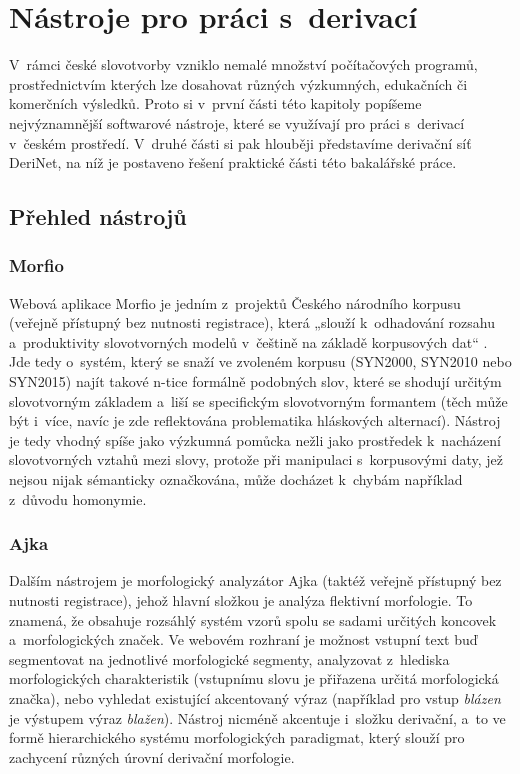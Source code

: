 \hypertarget{nuxe1stroje-pro-pruxe1ci-s-derivacuxed}{%
\chapter{Nástroje pro práci
s~derivací}\label{nuxe1stroje-pro-pruxe1ci-s-derivacuxed}}

V~rámci české slovotvorby vzniklo nemalé množství počítačových programů,
prostřednictvím kterých lze dosahovat různých výzkumných, edukačních či
komerčních výsledků. Proto si v~první části této kapitoly popíšeme
nejvýznamnější softwarové nástroje, které se využívají pro práci
s~derivací v~českém prostředí. V~druhé části si pak hlouběji představíme
derivační síť DeriNet, na níž je postaveno řešení praktické části této
bakalářské práce.

\hypertarget{pux159ehled-nuxe1strojux16f}{%
\section{Přehled nástrojů}\label{pux159ehled-nuxe1strojux16f}}

\hypertarget{morfio}{%
\subsection{Morfio}\label{morfio}}

Webová aplikace Morfio je jedním z~projektů Českého národního korpusu
(veřejně přístupný bez nutnosti registrace), která „slouží k~odhadování
rozsahu a~produktivity slovotvorných modelů v~češtině na základě
korpusových dat`` \parencite{cvrcek13}. Jde tedy o~systém, který se
snaží ve zvoleném korpusu (SYN2000, SYN2010 nebo SYN2015) najít takové
n-tice formálně podobných slov, které se shodují určitým slovotvorným
základem a~liší se specifickým slovotvorným formantem (těch může být
i~více, navíc je zde reflektována problematika hláskových alternací).
Nástroj je tedy vhodný spíše jako výzkumná pomůcka nežli jako prostředek
k~nacházení slovotvorných vztahů mezi slovy, protože při manipulaci
s~korpusovými daty, jež nejsou nijak sémanticky označkována, může docházet
k~chybám například z~důvodu homonymie. \parencite{cvrcek13}

\hypertarget{ajka}{%
\subsection{Ajka}\label{ajka}}

Dalším nástrojem je morfologický analyzátor Ajka (taktéž veřejně
přístupný bez nutnosti registrace), jehož hlavní složkou je analýza
flektivní morfologie. To znamená, že obsahuje rozsáhlý systém vzorů
spolu se sadami určitých koncovek a~morfologických značek. Ve webovém
rozhraní je možnost vstupní text buď segmentovat na jednotlivé
morfologické segmenty, analyzovat z~hlediska morfologických
charakteristik (vstupnímu slovu je přiřazena určitá morfologická
značka), nebo vyhledat existující akcentovaný výraz (například pro vstup
\emph{blázen} je výstupem výraz \emph{blažen}). Nástroj nicméně
akcentuje i~složku derivační, a~to ve formě hierarchického systému
morfologických paradigmat, který slouží pro zachycení různých úrovní
derivační morfologie. \parencite{ajka}

